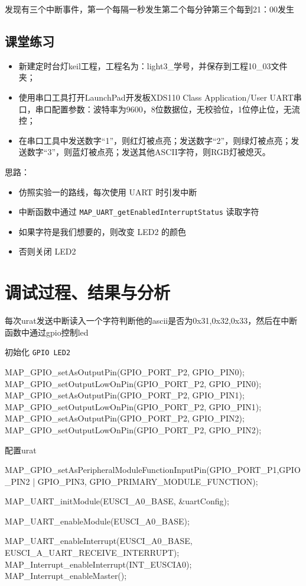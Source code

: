 \documentclass[a4paper,10pt,UTF8]{paper}
\numberwithin{equation}{section}
\numberwithin{figure}{section}
\begin{document}
发现有三个中断事件，第一个每隔一秒发生第二个每分钟第三个每到21：00发生

\subsection{课堂练习}

\begin{itemize}
  \item 新建定时台灯keil工程，工程名为：light3\_学号，并保存到工程10\_03文件夹；
  \item 使用串口工具打开LaunchPad开发板XDS110 Class Application/User UART串口，串口配置参数：波特率为9600，8位数据位，无校验位，1位停止位，无流控；
  \item 在串口工具中发送数字“1”，则红灯被点亮；发送数字“2”，则绿灯被点亮；发送数字“3”，则蓝灯被点亮；发送其他ASCII字符，则RGB灯被熄灭。
\end{itemize}

思路：

\begin{itemize}
  \item 仿照实验一的路线，每次使用 UART 时引发中断
  \item 中断函数中通过 \texttt{MAP\_UART\_getEnabledInterruptStatus} 读取字符
  \item 如果字符是我们想要的，则改变 LED2 的颜色
  \item 否则关闭 LED2 
\end{itemize}

\section{调试过程、结果与分析}

每次urat发送中断读入一个字符判断他的ascii是否为0x31,0x32,0x33，然后在中断函数中通过gpio控制led

初始化 \texttt{GPIO LED2}

\begin{ccode}
  MAP_GPIO_setAsOutputPin(GPIO_PORT_P2, GPIO_PIN0);
  MAP_GPIO_setOutputLowOnPin(GPIO_PORT_P2, GPIO_PIN0);
  MAP_GPIO_setAsOutputPin(GPIO_PORT_P2, GPIO_PIN1);
  MAP_GPIO_setOutputLowOnPin(GPIO_PORT_P2, GPIO_PIN1);
  MAP_GPIO_setAsOutputPin(GPIO_PORT_P2, GPIO_PIN2);
  MAP_GPIO_setOutputLowOnPin(GPIO_PORT_P2, GPIO_PIN2);
\end{ccode}

配置urat

\begin{ccode}
  MAP_GPIO_setAsPeripheralModuleFunctionInputPin(GPIO_PORT_P1,GPIO_PIN2 
  | GPIO_PIN3, GPIO_PRIMARY_MODULE_FUNCTION);
  
  MAP_UART_initModule(EUSCI_A0_BASE, &uartConfig);

  MAP_UART_enableModule(EUSCI_A0_BASE);
  
  MAP_UART_enableInterrupt(EUSCI_A0_BASE, EUSCI_A_UART_RECEIVE_INTERRUPT);
  MAP_Interrupt_enableInterrupt(INT_EUSCIA0);  
  MAP_Interrupt_enableMaster();    
\end{ccode}
\end{document}
